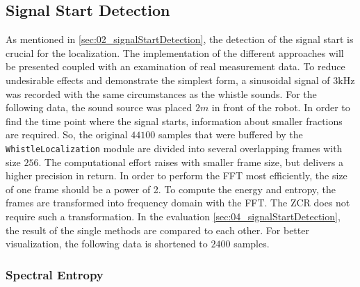 \subsection{Signal Start Detection}
\label{subsec:03_signalStartDetection}

As mentioned in \cref{sec:02_signalStartDetection}, the detection of the
signal start is crucial for the localization.
The implementation of the different approaches will be presented coupled with
an examination of real measurement data.
To reduce undesirable effects and demonstrate the simplest form, a sinusoidal
signal of $3\si{\kilo\hertz}$ was recorded with the same circumstances as the
whistle sounds.
For the following data, the sound source was placed $2\si{m}$ in front of the robot.
In order to find the time point where the signal starts, information about
smaller fractions are required.
So, the original $44100$ samples that were buffered by the
\lstinline!WhistleLocalization! module are divided into several overlapping
frames with size $256$. The computational effort raises with smaller frame size,
but delivers a higher precision in return.
In order to perform the \ac{FFT} most efficiently, the size of one frame
should be a power of 2.
To compute the energy and entropy, the frames are transformed into
frequency domain with the \ac{FFT}.
The \ac{ZCR} does not require such a transformation.
In the evaluation \cref{sec:04_signalStartDetection}, the result of the single
methods are compared to each other.
For better visualization, the following data is shortened to $2400$ samples.


\subsubsection*{Spectral Entropy}

